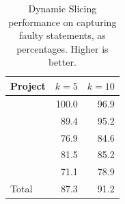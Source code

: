 \documentclass{article}
\begin{document}
\begin{table}[h]
  \small
	\centering
	\setlength{\tabcolsep}{4pt}
	\begin{tabular}{lrr}
		\toprule
		Project             &  \multicolumn{1}{c}{$k=5$} & \multicolumn{1}{c}{$k=10$} \\ %
		\midrule

        \lang{}            & 100.0 & 96.9\\
        \cmath{}           & 89.4 & 95.2\\
		\chart{}			& 76.9 & 84.6 \\
        \jtime{}            & 81.5 & 85.2\\
        \mockito{}          & 71.1 & 78.9\\\midrule
        Total          & 87.3 & 91.2\\


		\bottomrule
	\end{tabular}
	\caption {Dynamic Slicing performance on capturing faulty statements, as
     percentages. Higher is better.}
   \label{tab:ds-cases-captured}
\vspace{-0.2cm}

\end{table}


\end{document}
